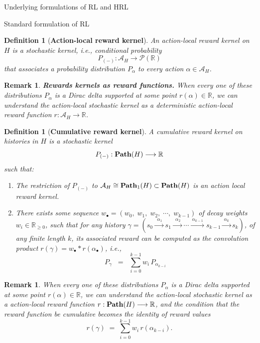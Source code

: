 \documentclass[11pt]{article}
\newtheorem{definition}[subsubsection]{Definition}
\newtheorem{remark}[subsubsection]{Remark}
\begin{document}
\begin{section}{Underlying formulations of RL and HRL}
\begin{subsection}{Standard formulation of RL}
\begin{definition}[{\bf Action-local reward kernel}]
An {\em action-local reward kernel} on $H$ is a stochastic kernel, i.e., conditional probability
$$
P_{(-)}:\mathcal{A}_{H}\longrightarrow \mathcal{P}(\mathbb{R})
$$
that associates a probability distribution $P_{\alpha}$ to every action $\alpha\in\mathcal{A}_{H}$.
\end{definition}

\begin{remark}
{\bf Rewards kernels as reward functions.}
\normalfont
When every one of these distributions $P_{\!\alpha}$ is a Dirac delta supported at some point $r(\alpha)\in\mathbb{R}$, we can understand the action-local stochastic kernel as a deterministic {\em action-local reward function}
$
r:\mathcal{A}_{H}\longrightarrow\mathbb{R}
$.
\end{remark}

\begin{definition}[{\bf Cumulative reward kernel}]
A {\em cumulative reward kernel} on histories in $H$ is a stochastic kernel
$$
P_{(-)}:\bold{Path}(H)\longrightarrow \mathbb{R}
$$
such that:
\begin{enumerate}
\item
The restriction of $P_{(-)}$ to $\mathcal{A}_{H}\cong\bold{Path}_{1}(H)\subset\bold{Path}(H)$ is an action local reward kernel.
\item
There exists some sequence $w_{\bullet}=(w_{0}, \;w_{1},\;w_{2},\;\cdots,\;w_{k-1})$ of {\em decay weights} $w_{i}\in\mathbb{R}_{\ge0}$, such that for any history $\gamma=(s_{0}\xrightarrow{\ \ \alpha_{1}\ }s_{1}\xrightarrow{\ \ \alpha_{2}\ }\cdots\xrightarrow{\ \alpha_{k-1}\ }s_{k-1}\xrightarrow{\ \alpha_{k}\ }s_{k})$, of any finite length $k$, its associated reward can be computed as the convolution product $r(\gamma)=w_{\bullet}\ast r(\alpha_{\bullet})$, i.e.,
$$
    P_{\gamma}\;\;=\;\;\sum_{i=0}^{k-1} w_{i}\,P_{\alpha_{k-i}}
$$
\end{enumerate}
\end{definition}
 
\begin{remark}
\normalfont
When every one of these distributions $P_{\!\alpha}$ is a Dirac delta supported at some point $r(\alpha)\in\mathbb{R}$, we can understand the action-local stochastic kernel as a {\em action-local reward function}
$
r:\bold{Path}(H)\longrightarrow\mathbb{R}
$,
and the condition that the reward function be cumulative becomes the identity of reward values
$$
    r(\gamma)\;=\;\sum_{i=0}^{k-1} w_{i}\,r(\alpha_{k-i}).
$$
\end{remark}


\end{subsection}
\end{section}
\end{document}

